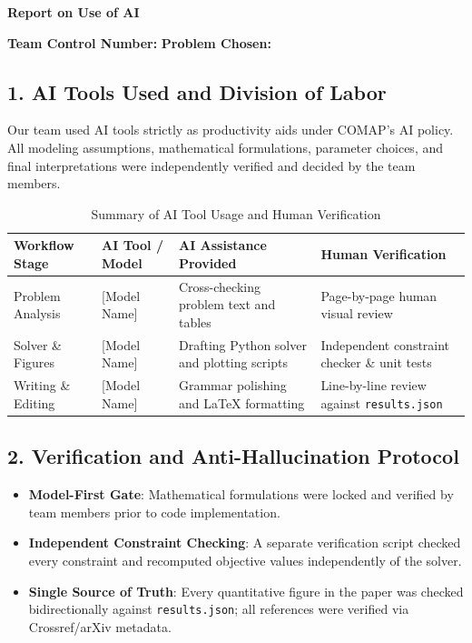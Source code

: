 
\newpage
\thispagestyle{empty}
\begin{center}
  {\Large\bfseries Report on Use of AI}
\end{center}
\vspace{1em}

\noindent\textbf{Team Control Number:} \TeamNumber \hfill \textbf{Problem Chosen:} \ProblemChosen

\subsection*{1. AI Tools Used and Division of Labor}
Our team used AI tools strictly as productivity aids under COMAP's AI policy. All modeling assumptions, mathematical formulations, parameter choices, and final interpretations were independently verified and decided by the team members.

\begin{table}[htbp]
\centering
\caption{Summary of AI Tool Usage and Human Verification}
\begin{tabular}{p{3.2cm}p{3.2cm}p{4.3cm}p{4.3cm}}
\toprule
Workflow Stage & AI Tool / Model & AI Assistance Provided & Human Verification \\
\midrule
Problem Analysis & [Model Name] & Cross-checking problem text and tables & Page-by-page human visual review \\
Solver \& Figures & [Model Name] & Drafting Python solver and plotting scripts & Independent constraint checker \& unit tests \\
Writing \& Editing & [Model Name] & Grammar polishing and LaTeX formatting & Line-by-line review against \texttt{results.json} \\
\bottomrule
\end{tabular}
\end{table}

\subsection*{2. Verification and Anti-Hallucination Protocol}
\begin{itemize}
  \item \textbf{Model-First Gate}: Mathematical formulations were locked and verified by team members prior to code implementation.
  \item \textbf{Independent Constraint Checking}: A separate verification script checked every constraint and recomputed objective values independently of the solver.
  \item \textbf{Single Source of Truth}: Every quantitative figure in the paper was checked bidirectionally against \texttt{results.json}; all references were verified via Crossref/arXiv metadata.
\end{itemize}

